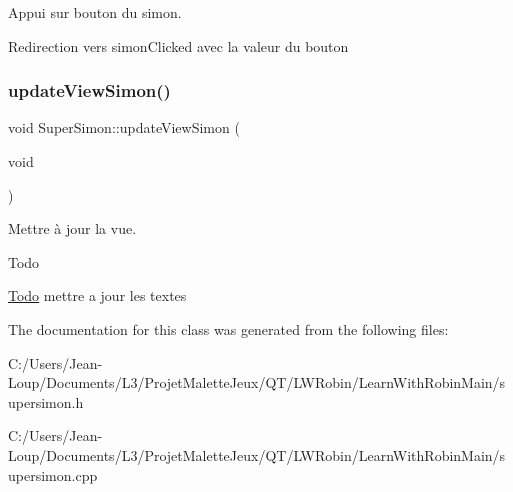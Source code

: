Appui sur bouton du simon. 

Redirection vers simon\+Clicked avec la valeur du bouton \mbox{\label{class_super_simon_a8d5c23562cd6b048720003d3c796ac7a}} 
\subsubsection{\texorpdfstring{update\+View\+Simon()}{updateViewSimon()}}
{\footnotesize\ttfamily void Super\+Simon\+::update\+View\+Simon (\begin{DoxyParamCaption}\item[{void}]{ }\end{DoxyParamCaption})}



Mettre à jour la vue. 

\begin{DoxyRefDesc}{Todo}
\item[\hyperlink{todo__todo000028}{Todo}]mettre a jour les textes \end{DoxyRefDesc}


The documentation for this class was generated from the following files\+:\begin{DoxyCompactItemize}
\item 
C\+:/\+Users/\+Jean-\/\+Loup/\+Documents/\+L3/\+Projet\+Malette\+Jeux/\+Q\+T/\+L\+W\+Robin/\+Learn\+With\+Robin\+Main/supersimon.\+h\item 
C\+:/\+Users/\+Jean-\/\+Loup/\+Documents/\+L3/\+Projet\+Malette\+Jeux/\+Q\+T/\+L\+W\+Robin/\+Learn\+With\+Robin\+Main/supersimon.\+cpp\end{DoxyCompactItemize}
